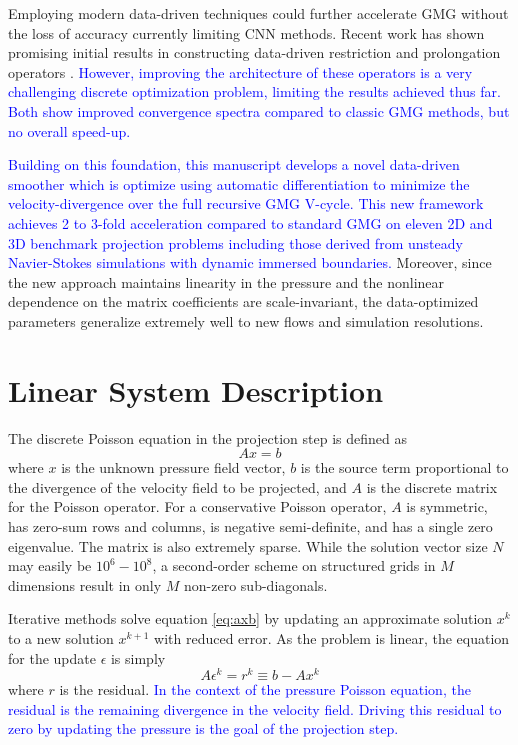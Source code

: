 \documentclass[review]{elsarticle}
\begin{document}
Employing modern data-driven techniques could  further accelerate GMG without the loss of accuracy currently limiting CNN methods.  Recent work has shown promising initial results in constructing data-driven restriction and prolongation operators \cite{KATRUTSA2020112524,greenfeld2019learning}. \textcolor{blue}{However, improving the architecture of these operators is a very challenging discrete optimization problem, limiting the results achieved thus far. Both \cite{KATRUTSA2020112524,greenfeld2019learning} show improved convergence spectra compared to classic GMG methods, but no overall speed-up. }

\textcolor{blue}{Building on this foundation, this manuscript develops a novel data-driven smoother which is optimize using automatic differentiation to minimize the velocity-divergence over the full recursive GMG V-cycle. This new framework achieves 2 to 3-fold acceleration compared to standard GMG on eleven 2D and 3D benchmark projection problems including those derived from unsteady Navier-Stokes simulations with dynamic immersed boundaries.} Moreover, since the new approach maintains linearity in the pressure and the nonlinear dependence on the matrix coefficients are scale-invariant, the data-optimized parameters generalize extremely well to new flows and simulation resolutions.

\section{Linear System Description}

The discrete Poisson equation in the projection step is defined as
\begin{equation}\label{eq:axb}
    A x = b
\end{equation}
where $x$ is the unknown pressure field vector, $b$ is the source term proportional to the divergence of the velocity field to be projected, and $A$ is the discrete matrix for the Poisson operator. For a conservative Poisson operator, $A$ is symmetric, has zero-sum rows and columns, is negative semi-definite, and has a single zero eigenvalue. The matrix is also extremely sparse. While the solution vector size $N$ may easily be $10^6-10^8$, a second-order scheme on structured grids in $M$ dimensions result in only $M$ non-zero sub-diagonals.

Iterative methods solve equation \ref{eq:axb} by updating an approximate solution $x^k$ to a new solution $x^{k+1}$ with reduced error. As the problem is linear, the equation for the update $\epsilon$ is simply
\begin{equation}\label{eq:aer} 
    A \epsilon^k = r^k \equiv b - Ax^k
\end{equation}
where $r$ is the residual. \textcolor{blue}{In the context of the pressure Poisson equation, the residual is the remaining divergence in the velocity field. Driving this residual to zero by updating the pressure is the goal of the projection step.} 
\end{document}
